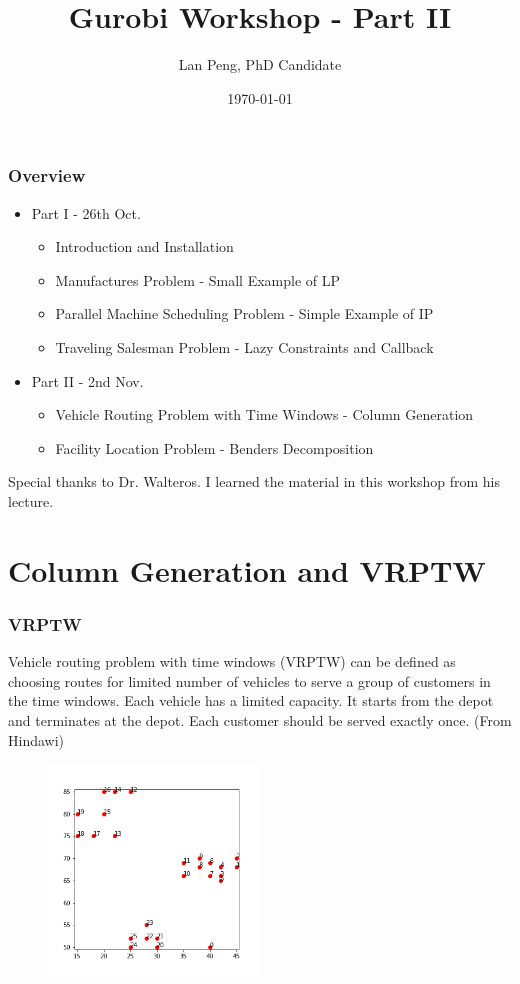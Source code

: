 \documentclass[10pt]{beamer}
\title{Gurobi Workshop - Part II}
\author{Lan Peng, PhD Candidate}
\institute{Department of Industrial \& Systems Engineering\\University at Buffalo, SUNY}
\date{\today}
\begin{document}
	\begin{frame}[plain]
		\titlepage
	\end{frame}

	\begin{frame}
		\frametitle{Overview}
		\begin{itemize}
			\item Part I - 26th Oct.
			\begin{itemize}
				\item Introduction and Installation
				\item Manufactures Problem - Small Example of LP
				\item Parallel Machine Scheduling Problem - Simple Example of IP
				\item Traveling Salesman Problem - Lazy Constraints and Callback
			\end{itemize}
			\item Part II - 2nd Nov.
			\begin{itemize}
				\item Vehicle Routing Problem with Time Windows - Column Generation
				\item Facility Location Problem - Benders Decomposition
			\end{itemize}
		\end{itemize}
	\end{frame}

	\begin{frame}
		\vfill
		Special thanks to Dr. Walteros. I learned the material in this workshop from his lecture.
		\vfill
	\end{frame}

	\section{Column Generation and VRPTW}
	\begin{frame}
		\frametitle{VRPTW}
		Vehicle routing problem with time windows (VRPTW) can be defined as choosing routes for limited number of vehicles to serve a group of customers in the time windows. Each vehicle has a limited capacity. It starts from the depot and terminates at the depot. Each customer should be served exactly once. (From Hindawi)
		\begin{figure}[!h]
			\centering
			\includegraphics[width=0.5\textwidth]{VRPTW}
		\end{figure}
	\end{frame}
\end{document}
